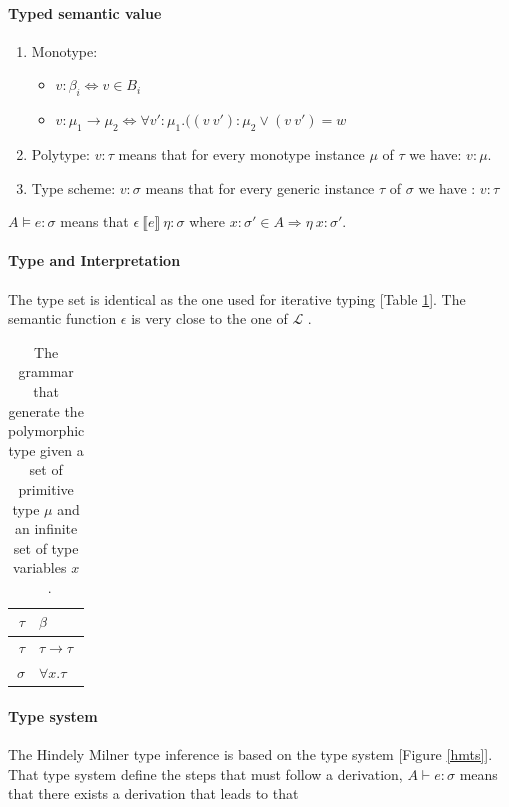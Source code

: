 \documentclass[a4paper]{report}
\newcommand{\lang}[0]{\mathcal{L}}
\newcommand{\reftab}[1]{[Table \ref{#1}]}
\newcommand{\reffig}[1]{[Figure \ref{#1}]}
\begin{document}
\paragraph{Typed semantic value}
\begin{enumerate}
\item Monotype:
	\begin{itemize}
	\item $v:\beta_i\Leftrightarrow v\in B_i$
	\item $v:\mu_1\to\mu_2\Leftrightarrow \forall v':\mu_1.((v\ v'):\mu_2\vee (v\ v')=w$
	\end{itemize}
\item Polytype: $v:\tau$ means that for every monotype instance $\mu$ of $\tau$ we have: $v:\mu$.
\item Type scheme: $v:\sigma$ means that for every generic instance $\tau$ of $\sigma$ we have : $v:\tau$
\end{enumerate}
$A\vDash e:\sigma$ means that $\epsilon\ \llbracket e\rrbracket\ \eta:\sigma$ where $x:\sigma' \in A\Rightarrow \eta\ x:\sigma'$. 

\paragraph{Type and Interpretation} The type set is identical as the one used for iterative typing \reftab{hmt}. The semantic function $\epsilon$ is very close to the one of $\lang$ \cite{hm1}. 

\begin{table}
\centering
\begin{tabular}{|r|l|}
\hline
$\tau$ & $\beta$\\
\hline
$\tau$ & $\tau \to \tau$\\
\hline
$\sigma$ & $\forall x . \tau$\\
\hline
\end{tabular}
\caption{The grammar that generate the polymorphic type given a set of primitive type $\mu$ and an infinite set of type variables $x$ ~\cite{damas}.}
\label{hmt}
\end{table}

\paragraph{Type system} The Hindely Milner type inference is based on the type system \reffig{hmts}. That type system define the steps that must follow a derivation, $A\vdash e:\sigma$ means that there exists a derivation that leads to that 
\end{document}
